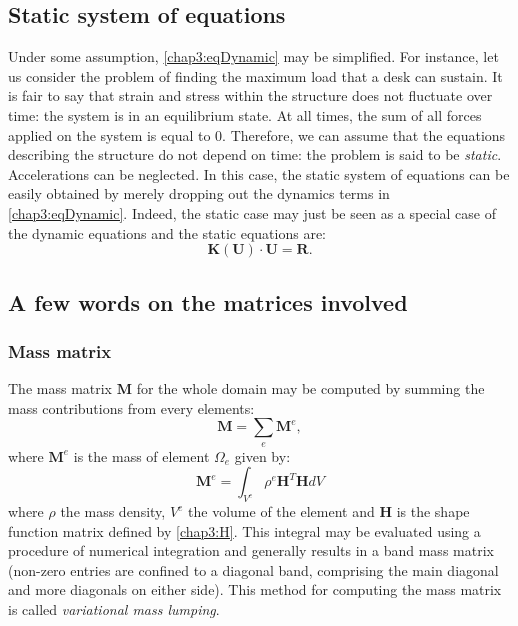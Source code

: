 	\subsection{Static system of equations}	\label{chap3:static}
Under some assumption, \eqref{chap3:eqDynamic} may be simplified. For instance, let us consider the problem of finding the maximum load that a desk can sustain. It is fair to say that strain and stress within the structure does not fluctuate over time: the system is in an equilibrium state. At all times, the sum of all forces applied on the system is equal to $ 0 $. Therefore, we can assume that the equations describing the structure do not depend on time: the problem is said to be \emph{static}. Accelerations can be neglected. In this case, the static system of equations can be easily obtained by merely dropping out the dynamics terms in \eqref{chap3:eqDynamic}. Indeed, the static case may just be seen as a special case of the dynamic equations and the static equations are:
\begin{equation}
\label{chap3:eqStatic}
\mathbf{K}(\mathbf{U}) \cdot \mathbf{U} = \mathbf{R}.
\end{equation}

	\subsection{A few words on the matrices involved} \label{chap3:wordOnMatrices}
		
		\subsubsection*{Mass matrix}
The mass matrix $ \mathbf{M} $ for the whole domain may be computed by summing the mass contributions from every elements:
\begin{equation}
\mathbf{M} = \sum_e \mathbf{M}^e,
\end{equation}
where $ \mathbf{M}^e $ is the mass of element $ \Omega_e $ given by:
\begin{equation}
\mathbf{M}^e = \int_{V^e} \rho^e \mathbf{H}^T \mathbf{H} dV
\end{equation}
where $ \rho $ the mass density, $ V^e $ the volume of the element and $ \mathbf{H} $ is the shape function matrix defined by \eqref{chap3:H}. This integral may be evaluated using a procedure of numerical integration and generally results in a band mass matrix (non-zero entries are confined to a diagonal band, comprising the main diagonal and more diagonals on either side). This method for computing the mass matrix is called \emph{variational mass lumping}.

